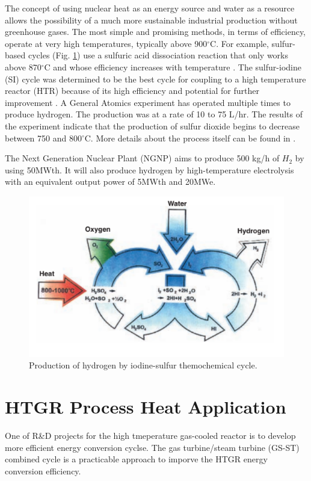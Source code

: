 The concept of using nuclear heat as an energy source and water as a resource allows the possibility of a much more sustainable industrial production without greenhouse gases. The most simple and promising methods, in terms of efficiency, operate at very high temperatures, typically above 900$^{\circ}$C. For example, sulfur-based cycles (Fig. \ref{fig:isulfur}) use a sulfuric acid dissociation reaction that only works above 870$^{\circ}$C and whose efficiency increases with temperature \cite{cea_gas-cooled_2006}. The sulfur-iodine (SI) cycle was determined to be the best cycle for coupling to a high temperature reactor (HTR) because of its high efficiency and potential for further improvement \cite{benjamin_russ_sulfur_2009}. A General Atomics experiment has operated multiple times to produce hydrogen. The production was at a rate of 10 to 75 L/hr. The results of the experiment indicate that the production of sulfur dioxide begins to decrease between 750 and 800$^{\circ}$C. More details about the process itself can be found in \cite{benjamin_russ_sulfur_2009}.

The Next Generation Nuclear Plant (NGNP) \cite{macdonald_ngnp_2003} aims to produce 500 kg/h of $H_2$ by using 50MWth. It will also produce hydrogen by high-temperature electrolysis with an equivalent output power of 5MWth and 20MWe.

\begin{figure}[H]
	\centering
	\includegraphics[width=0.4\linewidth]{figures/iodine-sulfur.png}
	\hfill
	\caption{Production of hydrogen by iodine-sulfur themochemical cycle.}
	\label{fig:isulfur}
\end{figure}

\section{HTGR Process Heat Application}

One of R\&D projects for the high tmeperature gas-cooled reactor is to develop more efficient energy conversion cyclse. The gas turbine/steam turbine (GS-ST) combined cycle is a practicable approach to imporve the HTGR energy conversion efficiency.

